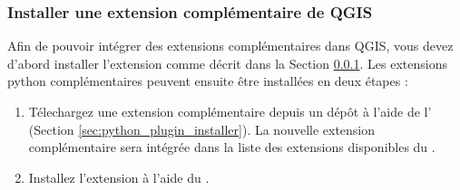 

\subsubsection{Installer une extension complémentaire de QGIS}\label{sec:load_external_plugin} 

Afin de pouvoir intégrer des extensions complémentaires dans QGIS, vous devez d'abord installer l'extension  comme décrit dans la Section \ref{sec:load_external_plugin}.
Les extensions python complémentaires peuvent ensuite être installées en deux étapes :

\begin{enumerate}
\item Télechargez une extension complémentaire depuis un dépôt à l'aide de l' (Section \ref{sec:python_plugin_installer}).
La nouvelle extension complémentaire sera intégrée dans la liste des extensions disponibles du .
\item Installez l'extension à l'aide du .
\end{enumerate}



